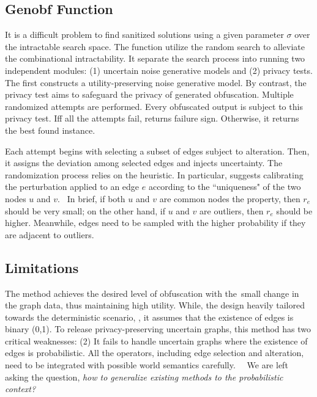 \subsection{Genobf Function}
It is a difficult problem to find {\keobf} sanitized solutions using a given parameter $\sigma$ over the intractable search space. 
The function {\genobf} utilize the random search to alleviate the combinational intractability. 
It separate the search process into running two independent modules: (1) uncertain noise generative models and (2) privacy tests. 
The first constructs a utility-preserving noise generative model. 
By contrast, the privacy test aims to safeguard the privacy of generated obfuscation.  
Multiple randomized attempts are performed. 
Every obfuscated output is subject to this privacy test. 
Iff all the attempts fail, {\genobf} returns failure sign. Otherwise, it returns the best found {\keobf} instance. 

Each attempt begins with selecting a subset of edges subject to alteration. 
Then, it assigns the deviation among selected edges and injects uncertainty. 
The randomization process relies on the heuristic.  
In particular, {\soaName} suggests calibrating the perturbation applied to an edge $e$ according to the ``uniqueness" of the two nodes $u$ and $v$. 
In brief, if both $u$ and $v$ are common nodes {\wrt} the property, then $r_{e}$ should be very small; 
on the other hand, if $u$ and $v$ are outliers, then $r_{e}$ should be higher. 
Meanwhile, edges need to be sampled with the higher probability if they are adjacent to outliers. 

\subsection{Limitations} 
The {\soaName} method achieves the desired level of obfuscation with the small change in the graph data, thus maintaining high utility.
While, the design heavily tailored towards the deterministic scenario, {\eg}, it assumes that the existence of edges is binary (0,1).
To release privacy-preserving uncertain graphs, this method has two critical weaknesses: 
(2) It fails to handle uncertain graphs where the existence of edges is probabilistic. 
All the operators, including edge selection and alteration, need to be integrated with possible world semantics carefully.  
We are left asking the question, \emph{how to generalize existing methods to the probabilistic context?}



